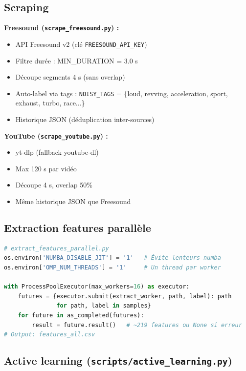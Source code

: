 \documentclass[11pt,a4paper]{article}
\newcommand{\code}[1]{\texttt{\small #1}}
\begin{document}
\subsection{Scraping}

\textbf{Freesound (\code{scrape\_freesound.py}) :}
\begin{itemize}
  \item API Freesound v2 (clé \code{FREESOUND\_API\_KEY})
  \item Filtre durée : MIN\_DURATION = 3.0 s
  \item Découpe segments 4 s (sans overlap)
  \item Auto-label via tags : \code{NOISY\_TAGS} = \{loud, revving, acceleration, sport, exhaust, turbo, race...\}
  \item Historique JSON (déduplication inter-sources)
\end{itemize}

\textbf{YouTube (\code{scrape\_youtube.py}) :}
\begin{itemize}
  \item yt-dlp (fallback youtube-dl)
  \item Max 120 s par vidéo
  \item Découpe 4 s, overlap 50\%
  \item Même historique JSON que Freesound
\end{itemize}

\subsection{Extraction features parallèle}

\begin{lstlisting}[language=Python,caption={Architecture workers}]
# extract_features_parallel.py
os.environ['NUMBA_DISABLE_JIT'] = '1'   # Évite lenteurs numba
os.environ['OMP_NUM_THREADS'] = '1'     # Un thread par worker

with ProcessPoolExecutor(max_workers=16) as executor:
    futures = {executor.submit(extract_worker, path, label): path
               for path, label in samples}
    for future in as_completed(futures):
        result = future.result()   # ~219 features ou None si erreur
# Output: features_all.csv
\end{lstlisting}

\subsection{Active learning (\texttt{scripts/active\_learning.py})}
\end{document}
